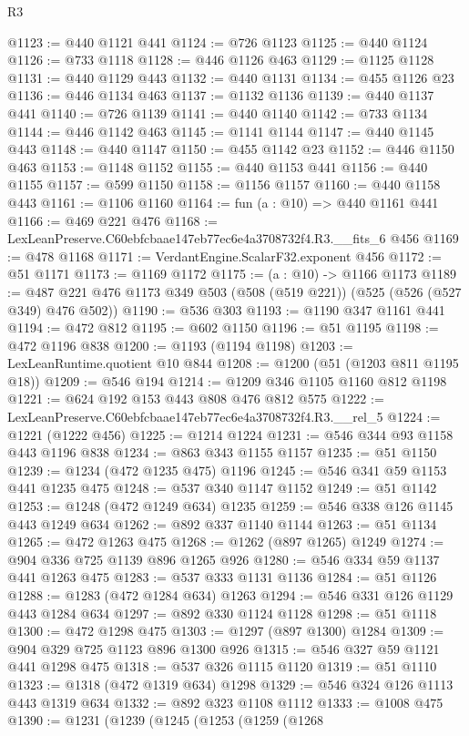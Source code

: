 \begin{lexlean}{R3}
\begin{coremodule}
@1123 := @440 @1121 @441
@1124 := @726 @1123
@1125 := @440 @1124
@1126 := @733 @1118
@1128 := @446 @1126 @463
@1129 := @1125 @1128
@1131 := @440 @1129 @443
@1132 := @440 @1131
@1134 := @455 @1126 @23
@1136 := @446 @1134 @463
@1137 := @1132 @1136
@1139 := @440 @1137 @441
@1140 := @726 @1139
@1141 := @440 @1140
@1142 := @733 @1134
@1144 := @446 @1142 @463
@1145 := @1141 @1144
@1147 := @440 @1145 @443
@1148 := @440 @1147
@1150 := @455 @1142 @23
@1152 := @446 @1150 @463
@1153 := @1148 @1152
@1155 := @440 @1153 @441
@1156 := @440 @1155
@1157 := @599 @1150
@1158 := @1156 @1157
@1160 := @440 @1158 @443
@1161 := @1106 @1160
@1164 := fun (a : @10) => @440 @1161 @441
@1166 := @469 @221 @476
@1168 := LexLeanPreserve.C60ebfcbaae147eb77ec6e4a3708732f4.R3.__fits_6 @456
@1169 := @478 @1168
@1171 := VerdantEngine.ScalarF32.exponent @456
@1172 := @51 @1171
@1173 := @1169 @1172
@1175 := (a : @10) -> @1166 @1173
@1189 := @487 @221 @476 @1173 @349 @503 (@508 (@519 @221)) (@525 (@526 (@527 @349) @476 @502))
@1190 := @536 @303
@1193 := @1190 @347 @1161 @441
@1194 := @472 @812
@1195 := @602 @1150
@1196 := @51 @1195
@1198 := @472 @1196 @838
@1200 := @1193 (@1194 @1198)
@1203 := LexLeanRuntime.quotient @10 @844
@1208 := @1200 (@51 (@1203 @811 @1195 @18))
@1209 := @546 @194
@1214 := @1209 @346 @1105 @1160 @812 @1198
@1221 := @624 @192 @153 @443 @808 @476 @812 @575
@1222 := LexLeanPreserve.C60ebfcbaae147eb77ec6e4a3708732f4.R3.__rel_5
@1224 := @1221 (@1222 @456)
@1225 := @1214 @1224
@1231 := @546 @344 @93 @1158 @443 @1196 @838
@1234 := @863 @343 @1155 @1157
@1235 := @51 @1150
@1239 := @1234 (@472 @1235 @475) @1196
@1245 := @546 @341 @59 @1153 @441 @1235 @475
@1248 := @537 @340 @1147 @1152
@1249 := @51 @1142
@1253 := @1248 (@472 @1249 @634) @1235
@1259 := @546 @338 @126 @1145 @443 @1249 @634
@1262 := @892 @337 @1140 @1144
@1263 := @51 @1134
@1265 := @472 @1263 @475
@1268 := @1262 (@897 @1265) @1249
@1274 := @904 @336 @725 @1139 @896 @1265 @926
@1280 := @546 @334 @59 @1137 @441 @1263 @475
@1283 := @537 @333 @1131 @1136
@1284 := @51 @1126
@1288 := @1283 (@472 @1284 @634) @1263
@1294 := @546 @331 @126 @1129 @443 @1284 @634
@1297 := @892 @330 @1124 @1128
@1298 := @51 @1118
@1300 := @472 @1298 @475
@1303 := @1297 (@897 @1300) @1284
@1309 := @904 @329 @725 @1123 @896 @1300 @926
@1315 := @546 @327 @59 @1121 @441 @1298 @475
@1318 := @537 @326 @1115 @1120
@1319 := @51 @1110
@1323 := @1318 (@472 @1319 @634) @1298
@1329 := @546 @324 @126 @1113 @443 @1319 @634
@1332 := @892 @323 @1108 @1112
@1333 := @1008 @475
@1390 := @1231
    (@1239
      (@1245
        (@1253
          (@1259
            (@1268

\end{coremodule}
\end{lexlean}
